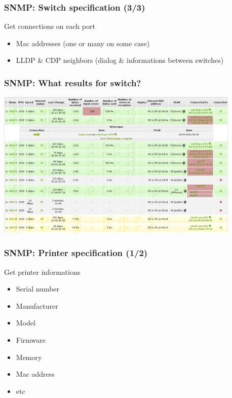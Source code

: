 \documentclass{beamer}
\begin{document}
\begin{frame}
    \frametitle{SNMP: Switch specification (3/3)}

    \begin{block}{Get connections on each port}
    \begin{itemize}
    \item Mac addresses (one or many on some case)
    \item LLDP \& CDP neighbors (dialog \& informations between switches)
    \end{itemize}
    \end{block}
\end{frame}

\begin{frame}
    \frametitle{SNMP: What results for switch?}

    \begin{center}
    \includegraphics[width=11.7cm]{./pics/switch_ports.png}
    \end{center}
\end{frame}

\begin{frame}
    \frametitle{SNMP: Printer specification (1/2)}

    \begin{block}{Get printer informations}
    \begin{itemize}
    \item Serial number
    \item Manufacturer
    \item Model
    \item Firmware
    \item Memory
    \item Mac address
    \item etc
    \end{itemize}
    \end{block}
\end{frame}
\end{document}
